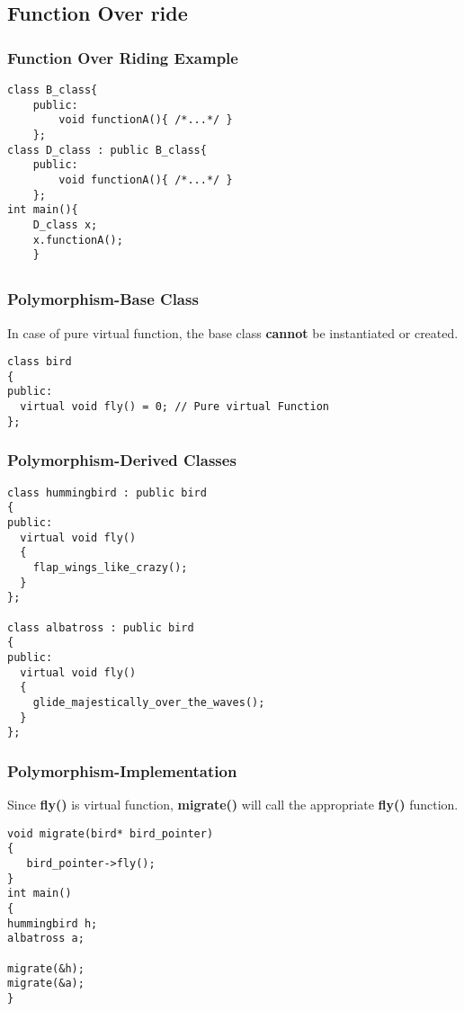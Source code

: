 \documentclass{beamer}
\newtheorem{Key points}{Key points}
\newcommand\Fontviaa{\fontsize{8}{7.2}\selectfont}
\begin{document}
\subsection{Function Over ride}

\begin{frame}[fragile]
\frametitle{Function Over Riding Example}
\begin{lstlisting}
class B_class{
	public:
		void functionA(){ /*...*/ }
	};
class D_class : public B_class{
	public:
		void functionA(){ /*...*/ } 
	};
int main(){
	D_class x;
	x.functionA(); 
	}
\end{lstlisting}
\end{frame}
\subsection{}
\begin{frame}[fragile]
\frametitle{Polymorphism-Base Class}
In case of pure virtual function, the base class {\color{blue}\textbf{cannot}} be instantiated or created.
\begin{lstlisting}
class bird
{
public:
  virtual void fly() = 0; // Pure virtual Function
};
\end{lstlisting}
\end{frame}
\begin{frame}[fragile]
\frametitle{Polymorphism-Derived Classes}
\Fontviaa
\begin{lstlisting}
class hummingbird : public bird
{
public:
  virtual void fly()
  {
    flap_wings_like_crazy();
  }
};

class albatross : public bird
{
public:
  virtual void fly()
  {
    glide_majestically_over_the_waves();
  }
};
\end{lstlisting}
\end{frame}
\begin{frame}[fragile]
\frametitle{Polymorphism-Implementation}
Since \textbf{fly()} is virtual function, \textbf{migrate()} will call the appropriate \textbf{fly()} function.
\begin{lstlisting}
void migrate(bird* bird_pointer)
{
   bird_pointer->fly();
}
int main()
{
hummingbird h;
albatross a;

migrate(&h);  
migrate(&a);
}
\end{lstlisting}
\end{frame}
\end{document}

